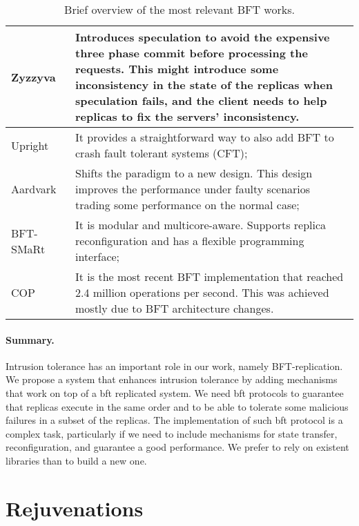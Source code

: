 \begin{table}[!t]
\begin{center}
{\footnotesize
\begin{tabular}{ p{2.5cm}  p{11cm}  }\hline
Zyzzyva~\cite{Kotla:2010}  & Introduces speculation to avoid the expensive three phase commit before processing the requests. This might introduce some inconsistency in the state of the replicas when speculation fails, and the client needs to help replicas to fix the servers’ inconsistency. \\ \hline			
Upright~\cite{Clement:2009} & It provides a straightforward way to also add BFT to crash fault tolerant systems (CFT); \\ \hline	
Aardvark~\cite{Clement:2009b} & Shifts the paradigm to a new design. This design improves the performance under faulty scenarios trading some performance on the normal case; \\ \hline
BFT-SMaRt~\cite{Bessani:2014} & It is modular and multicore-aware. Supports replica reconfiguration and has a flexible programming interface; \\ \hline
COP~\cite{Behl:2015} & It is the most recent BFT implementation that reached 2.4 million operations per second. This was achieved mostly due to BFT architecture changes.\\  \hline  
\end{tabular}
}
\caption{Brief overview of the most relevant BFT works.}
\label{tab:bft}
\end{center}
\end{table}

\paragraph{Summary.} 
Intrusion tolerance has an important role in our work, namely BFT-replication.
We propose a system that enhances intrusion tolerance by adding mechanisms that work on
top of a \gls{bft} replicated system. We need \gls{bft} protocols to guarantee that replicas execute in
the same order and to be able to tolerate some malicious failures in a subset of the replicas.
The implementation of such \gls{bft} protocol is a complex task, particularly if we need to
include mechanisms for state transfer, reconfiguration, and guarantee a good performance.
We prefer to rely on existent libraries than to build a new one.

\section{Rejuvenations}
\label{sec:rejuvenations}

